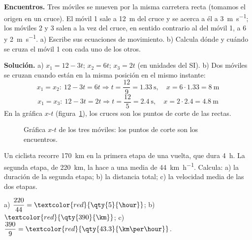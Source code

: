\begin{example}
    \textbf{Encuentros.} Tres móviles se mueven por la misma carretera recta (tomamos el origen en un cruce). El móvil 1 sale a
    \qty{12}{\m} del cruce y se acerca a él a \qty{3}{\m\per\s}; los móviles 2 y 3 salen a la vez del cruce, en sentido contrario al
    del móvil 1, a 6 y \qty{2}{\m\per\s}. a) Escribe sus ecuaciones de movimiento. b) Calcula dónde y cuándo se cruza el móvil 1 con
    cada uno de los otros.

    \textbf{Solución.} a) \(x_1 = 12 - 3t\); \(x_2 = 6t\); \(x_3 = 2t\) (en unidades del SI).
    b) Dos móviles se cruzan cuando están en la misma posición en el mismo instante:
    \[ x_1 = x_2:\ 12 - 3t = 6t \Rightarrow t = \frac{12}{9} = \qty{1.33}{\s},\quad x = 6 \cdot \num{1.33} = \qty{8}{\m} \]
    \[ x_1 = x_3:\ 12 - 3t = 2t \Rightarrow t = \frac{12}{5} = \qty{2.4}{\s},\quad x = 2 \cdot \num{2.4} = \qty{4.8}{\m} \]
    En la gráfica \(x\)-\(t\) (figura~\ref{fig:ud9-encuentros}), los cruces son los puntos de corte de las rectas.
\end{example}

\begin{figure}[H]
    \centering
    \caption{Gráfica \(x\)-\(t\) de los tres móviles: los puntos de corte son los encuentros.}
    \label{fig:ud9-encuentros}
\end{figure}

\begin{exercise}
    Un ciclista recorre \qty{170}{\km} en la primera etapa de una vuelta, que dura \qty{4}{\hour}. La segunda etapa, de
    \qty{220}{\km}, la hace a una media de \qty{44}{\km\per\hour}. Calcula: a) la duración de la segunda etapa; b) la distancia total;
    c) la velocidad media de las dos etapas.
    \begin{solu}
        a) \(\dfrac{220}{44} = \textcolor{red}{\qty{5}{\hour}}\); b) \(\textcolor{red}{\qty{390}{\km}}\); c) \(\dfrac{390}{9} =
        \textcolor{red}{\qty{43.3}{\km\per\hour}}\).
    \end{solu}
\end{exercise}

